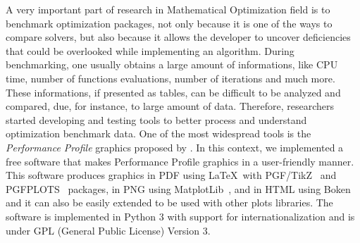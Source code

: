 A very important part of research in Mathematical Optimization field is to benchmark
optimization packages, not only because it is one of the ways to compare
solvers, but also because it allows the developer to uncover deficiencies that could
be overlooked while implementing  an algorithm. During benchmarking, one usually
obtains a large amount of  informations, like CPU time, number of functions
evaluations, number of iterations and much more. These informations, if
presented as tables, can be difficult to be analyzed and compared, due, for instance, to
large amount of data.  Therefore, researchers started developing and testing
tools to better process and understand optimization benchmark data. One of
the most widespread tools  is the \emph{Performance Profile} graphics proposed by
\textcite{Dolan:2002du}. In this context, we implemented a free software
that makes Performance Profile graphics in a user-friendly manner. This software produces graphics in PDF using \LaTeX\ with
PGF/TikZ~\cite{TikZ} and PGFPLOTS~\cite{pgfplots} packages, in
PNG using MatplotLib~\cite{Hunter:2007}, and in HTML using
Boken~\cite{url:bokeh} and it can also be easily
extended to be used with other plots libraries. The software is implemented
in Python 3 with support for internationalization and is under GPL (General
Public License) Version 3.
